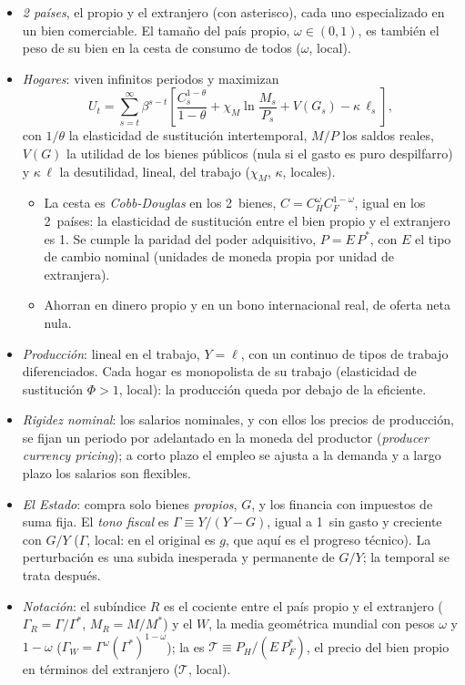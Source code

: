 \documentclass[11pt]{article}
\begin{document}
\begin{itemize}
\item \emph{2 países}, el propio y el extranjero (con asterisco), cada uno especializado en un bien comerciable. El tamaño del país propio, $\omega\in(0,1)$, es también el peso de su bien en la cesta de consumo de todos ($\omega$, local).
\item \emph{Hogares}: viven infinitos periodos y maximizan
  \begin{equation*}
  U_t=\sum_{s=t}^{\infty}\beta^{s-t}\left[\frac{C_s^{1-\theta}}{1-\theta}+\chi_M\ln\frac{M_s}{P_s}+V(G_s)-\kappa\,\ell_s\right],
  \end{equation*}
  con $1/\theta$ la elasticidad de sustitución intertemporal, $M/P$ los saldos reales, $V(G)$ la utilidad de los bienes públicos (nula si el gasto es puro despilfarro) y $\kappa\,\ell$ la desutilidad, lineal, del trabajo ($\chi_M$, $\kappa$, locales).
  \begin{itemize}
  \item La cesta es \emph{Cobb-Douglas} en los 2~bienes, $C=C_H^{\omega}C_F^{1-\omega}$, igual en los 2~países: la elasticidad de sustitución entre el bien propio y el extranjero es 1. Se cumple la paridad del poder adquisitivo, $P=E\,P^*$, con $E$ el tipo de cambio nominal (unidades de moneda propia por unidad de extranjera).
  \item Ahorran en dinero propio y en un bono internacional real, de oferta neta nula.
  \end{itemize}
\item \emph{Producción}: lineal en el trabajo, $Y=\ell$, con un continuo de tipos de trabajo diferenciados. Cada hogar es monopolista de su trabajo (elasticidad de sustitución $\Phi>1$, local): la producción queda por debajo de la eficiente.
\item \emph{Rigidez nominal}: los salarios nominales, y con ellos los precios de producción, se fijan un periodo por adelantado en la moneda del productor (\emph{producer currency pricing}); a corto plazo el empleo se ajusta a la demanda y a largo plazo los salarios son flexibles.
\item \emph{El Estado}: compra solo bienes \emph{propios}, $G$, y los financia con impuestos de suma fija. El \emph{tono fiscal} es $\Gamma\equiv Y/(Y-G)$, igual a 1~sin gasto y creciente con $G/Y$ ($\Gamma$, local: en el original es $g$, que aquí es el progreso técnico). La perturbación es una subida inesperada y permanente de $G/Y$; la temporal se trata después.
\item \emph{Notación}: el subíndice $R$ es el cociente entre el país propio y el extranjero ($\Gamma_R=\Gamma/\Gamma^*$, $M_R=M/M^*$) y el $W$, la media geométrica mundial con pesos $\omega$ y $1-\omega$ ($\Gamma_W=\Gamma^{\omega}(\Gamma^*)^{1-\omega}$); la  es $\mathcal{T}\equiv P_H/(E\,P^*_F)$, el precio del bien propio en términos del extranjero ($\mathcal{T}$, local).
\end{itemize}
\end{document}
